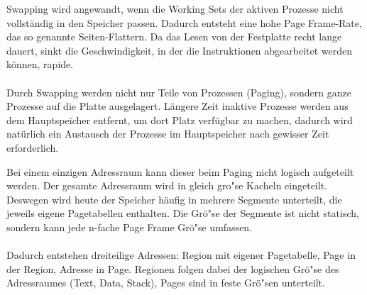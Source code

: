 \begin{answer}
  Swapping wird angewandt, wenn die Working Sets der aktiven Prozesse nicht vollständig in den Speicher passen. Dadurch entsteht eine hohe Page Frame-Rate, das so genannte Seiten-Flattern. Da das Lesen von der Festplatte recht lange dauert, sinkt die Geschwindigkeit, in der die Instruktionen abgearbeitet werden können, rapide.

  \paragraph*{}
  Durch Swapping werden nicht nur Teile von Prozessen (Paging), sondern ganze Prozesse auf die Platte ausgelagert. Längere Zeit inaktive Prozesse werden aus dem Hauptspeicher entfernt, um dort Platz verfügbar zu machen, dadurch wird natürlich ein Austausch der Prozesse im Hauptspeicher nach gewisser Zeit erforderlich.
\end{answer}

\begin{answer}
  Bei einem einzigen Adressraum kann dieser beim Paging nicht logisch aufgeteilt werden. Der gesamte Adressraum wird in gleich gro"se Kacheln eingeteilt.
  Deswegen wird heute der Speicher häufig in mehrere Segmente unterteilt, die jeweils eigene Pagetabellen enthalten.
  Die Grö"se der Segmente ist nicht statisch, sondern kann jede n-fache Page Frame Grö"se umfassen.

  \paragraph*{}
  Dadurch entstehen dreiteilige Adressen:
  Region mit eigener Pagetabelle, Page in der Region, Adresse in Page.
  Regionen folgen dabei der logischen Grö"se des Adressraumes (Text, Data, Stack), Pages sind in feste Grö"sen unterteilt.
\end{answer}

